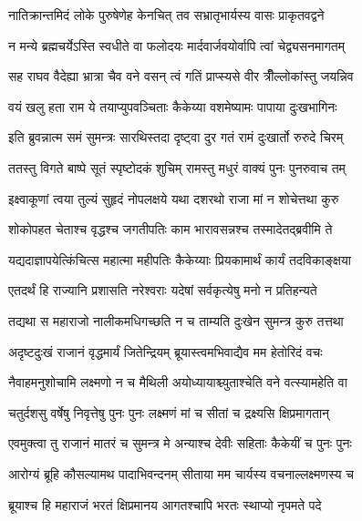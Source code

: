 \twolineshloka
{नातिक्रान्तमिदं लोके पुरुषेणेह केनचित्}
{तव सभ्रातृभार्यस्य वासः प्राकृतवद्वने} %

\twolineshloka
{न मन्ये ब्रह्मचर्येऽस्ति स्वधीते वा फलोदयः}
{मार्दवार्जवयोर्वापि त्वां चेद्व्यसनमागतम्} %

\twolineshloka
{सह राघव वैदेह्या भ्रात्रा चैव वने वसन्}
{त्वं गतिं प्राप्स्यसे वीर त्रीँल्लोकांस्तु जयन्निव} %

\twolineshloka
{वयं खलु हता राम ये तयाप्युपवञ्चिताः}
{कैकेय्या वशमेष्यामः पापाया दुःखभागिनः} %

\twolineshloka
{इति ब्रुवन्नात्म समं सुमन्त्रः सारथिस्तदा}
{दृष्ट्वा दुर गतं रामं दुःखार्तो रुरुदे चिरम्} %

\twolineshloka
{ततस्तु विगते बाष्पे सूतं स्पृष्टोदकं शुचिम्}
{रामस्तु मधुरं वाक्यं पुनः पुनरुवाच तम्} %

\twolineshloka
{इक्ष्वाकूणां त्वया तुल्यं सुहृदं नोपलक्षये}
{यथा दशरथो राजा मां न शोचेत्तथा कुरु} %

\twolineshloka
{शोकोपहत चेताश्च वृद्धश्च जगतीपतिः}
{काम भारावसन्नश्च तस्मादेतद्ब्रवीमि ते} %

\twolineshloka
{यद्यदाज्ञापयेत्किंचित्स महात्मा महीपतिः}
{कैकेय्याः प्रियकामार्थं कार्यं तदविकाङ्क्षया} %

\twolineshloka
{एतदर्थं हि राज्यानि प्रशासति नरेश्वराः}
{यदेषां सर्वकृत्येषु मनो न प्रतिहन्यते} %

\twolineshloka
{तद्यथा स महाराजो नालीकमधिगच्छति}
{न च ताम्यति दुःखेन सुमन्त्र कुरु तत्तथा} %

\twolineshloka
{अदृष्टदुःखं राजानं वृद्धमार्यं जितेन्द्रियम्}
{ब्रूयास्त्वमभिवाद्यैव मम हेतोरिदं वचः} %

\twolineshloka
{नैवाहमनुशोचामि लक्ष्मणो न च मैथिली}
{अयोध्यायाश्च्युताश्चेति वने वत्स्यामहेति वा} %

\twolineshloka
{चतुर्दशसु वर्षेषु निवृत्तेषु पुनः पुनः}
{लक्ष्मणं मां च सीतां च द्रक्ष्यसि क्षिप्रमागतान्} %

\twolineshloka
{एवमुक्त्वा तु राजानं मातरं च सुमन्त्र मे}
{अन्याश्च देवीः सहिताः कैकेयीं च पुनः पुनः} %

\twolineshloka
{आरोग्यं ब्रूहि कौसल्यामथ पादाभिवन्दनम्}
{सीताया मम चार्यस्य वचनाल्लक्ष्मणस्य च} %

\twolineshloka
{ब्रूयाश्च हि महाराजं भरतं क्षिप्रमानय}
{आगतश्चापि भरतः स्थाप्यो नृपमते पदे} %

